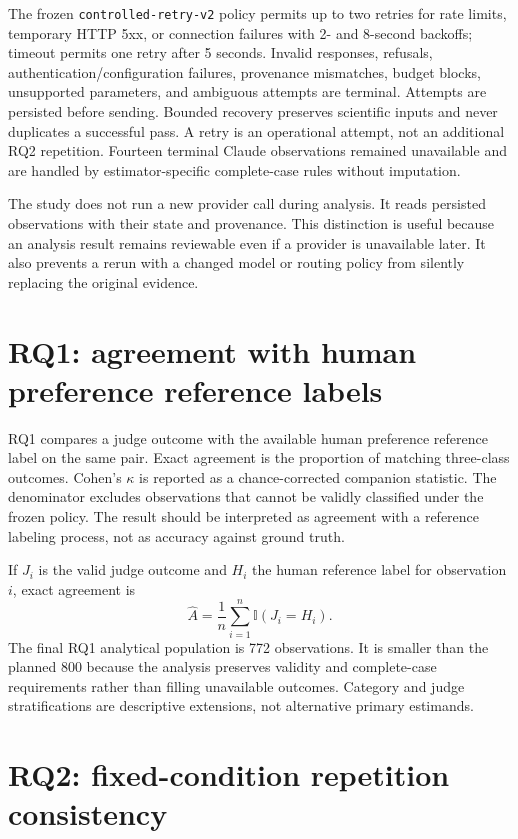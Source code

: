 The frozen \texttt{controlled-retry-v2} policy permits up to two retries for rate limits, temporary HTTP 5xx, or connection failures with 2- and 8-second backoffs; timeout permits one retry after 5 seconds. Invalid responses, refusals, authentication/configuration failures, provenance mismatches, budget blocks, unsupported parameters, and ambiguous attempts are terminal. Attempts are persisted before sending. Bounded recovery preserves scientific inputs and never duplicates a successful pass. A retry is an operational attempt, not an additional RQ2 repetition. Fourteen terminal Claude observations remained unavailable and are handled by estimator-specific complete-case rules without imputation.

The study does not run a new provider call during analysis. It reads persisted observations with their state and provenance. This distinction is useful because an analysis result remains reviewable even if a provider is unavailable later. It also prevents a rerun with a changed model or routing policy from silently replacing the original evidence.

\section{RQ1: agreement with human preference reference labels}

RQ1 compares a judge outcome with the available human preference reference label on the same pair. Exact agreement is the proportion of matching three-class outcomes. Cohen's $\kappa$ is reported as a chance-corrected companion statistic. The denominator excludes observations that cannot be validly classified under the frozen policy. The result should be interpreted as agreement with a reference labeling process, not as accuracy against ground truth.

If $J_i$ is the valid judge outcome and $H_i$ the human reference label for observation $i$, exact agreement is
\[
\hat{A}=\frac{1}{n}\sum_{i=1}^{n}\mathbb{I}(J_i=H_i).
\]
The final RQ1 analytical population is 772 observations. It is smaller than the planned 800 because the analysis preserves validity and complete-case requirements rather than filling unavailable outcomes. Category and judge stratifications are descriptive extensions, not alternative primary estimands.

\section{RQ2: fixed-condition repetition consistency}

